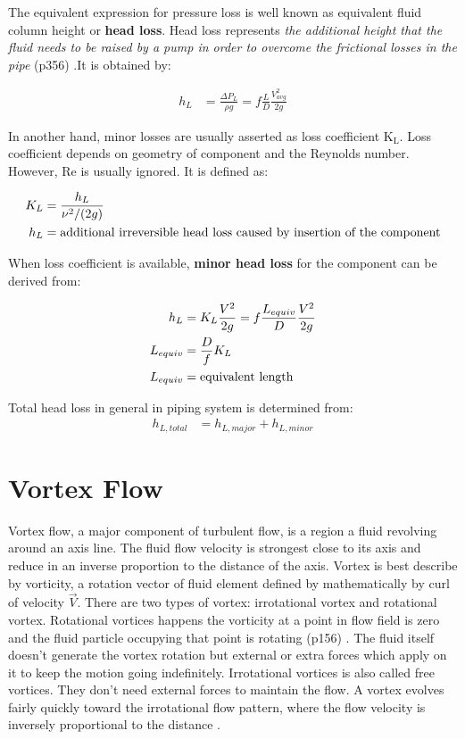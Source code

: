 The equivalent expression for pressure loss is well known as equivalent fluid column height or \textbf{head loss}. Head loss represents \textit{the additional height that the fluid needs to be raised by a pump in order to overcome the frictional losses in the pipe} (p356) \cite{cengel:book}.It is obtained by:

\begin{align}
 h_L & =  \frac{\Delta P_L}{\rho g} = f \frac{L}{D} \frac{V_{avg}^2 }{2g}
\end{align}

In another hand, minor losses are usually asserted as loss coefficient K$_{\text{L}}$.  Loss coefficient depends on geometry of component and the Reynolds number. However, Re is usually ignored. It is defined as:

\begin{align}
K_L & =  \frac{h_L}{\nu^2 / (2g)}  \\
h_L  & = \textnormal{additional irreversible head loss caused by insertion of the component}
\end{align}

When loss coefficient is available, \textbf{minor head loss} for the component can be derived from:

\begin{align}
 h_L & =  K_L \frac{V^2}{2g} = f \frac{L_{equiv}}{D} \frac{V^2 }{2g} \\
 L_{equiv} &= \frac{D}{f} K_L \\
 L_{equiv} &= \textnormal{equivalent length}
\end{align}

Total head loss in general in piping system is determined from:
\begin{align}
 h_{L, total} & = h_{L, major} + h_{L, minor}
\end{align}

\section{Vortex Flow}
Vortex flow, a major component of turbulent flow, is a region a fluid revolving around an axis line. The fluid flow velocity is strongest close to its axis and reduce in an inverse proportion to the distance of the axis. 
Vortex is best describe by vorticity, a rotation vector of fluid element defined by mathematically by curl of velocity $\vec{V}$. 
There are two types of vortex: irrotational vortex and rotational vortex. Rotational vortices happens the vorticity at a point in flow field is zero and the fluid particle occupying that point is rotating (p156)\cite{cengel:book} . The fluid itself doesn't generate the vortex rotation but external or extra forces which apply on it to keep the motion going indefinitely. Irrotational vortices is also called free vortices. They don't need external forces to maintain the flow. A vortex
evolves fairly quickly toward the irrotational flow pattern, where the flow velocity is inversely proportional to the distance \cite{wiki:web}.

